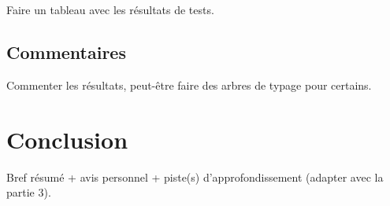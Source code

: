 \documentclass[11pt,a4paper]{article}
\theoremstyle{plain}
\theoremstyle{remark}
\theoremstyle{definition}
\begin{document}
Faire un tableau avec les résultats de tests.

\subsection{Commentaires}

Commenter les résultats, peut-être faire des arbres de typage pour certains.

\section*{Conclusion}

Bref résumé + avis personnel + piste(s) d'approfondissement (adapter avec la partie 3).




\end{document}
